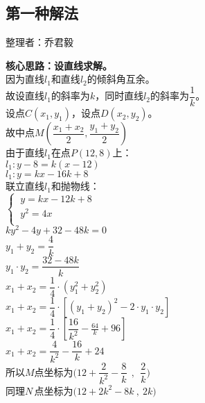 \documentclass[UTF8]{ctexart}
\begin{document}
\newpage

\subsection{第一种解法}
    \begin{center}
        整理者：乔君毅
    \end{center}
    \begin{multicols}{2}
        \small
        \textbf{核心思路：设直线求解。}\\[5mm]
        因为直线$l_1$和直线$l_2$的倾斜角互余。\\[5mm]
        故设直线$l_1$的斜率为$k$，同时直线$l_2$的斜率为$\dfrac{1}{k}$。\\[5mm]
        设点$C(x_1,y_1)$，设点$D(x_2,y_2)$。\\[5mm]
        故中点$M(\dfrac{x_1+x_2}{2},\dfrac{y_1+y_2}{2})$\\[5mm]
        由于直线$l_1$在点$P(12,8)$上：\\[3mm]
        $l_1:y-8=k(x-12)$\\[5mm]
        $l_1:y=kx-16k+8$\\[5mm]
        联立直线$l_1$和抛物线：\\[5mm]
        \begin{math}
            \begin{cases}
                ~y=kx-12k+8\\[1mm]
                ~y^2=4x\\[1mm]
                \end{cases}        
        \end{math}\\[5mm]
        $ky^2-4y+32-48k=0$\\[5mm]
        $y_1+y_2=\dfrac{4}{k}$\\[5mm]
        $y_1\cdot y_2=\dfrac{32-48k}{k} $\\[5mm]
        $x_1+x_2=\dfrac{1}{4}\cdot\left(y_1^2+y_2^2\right)$\\[5mm]
        $x_1+x_2=\dfrac{1}{4}\cdot\left[\left(y_1+y_2\right)^2-2\cdot y_1\cdot y_2\right]$\\[5mm]
        $x_1+x_2=\dfrac{1}{4}\cdot\left[\dfrac{16}{k^2}-\frac{64}{k}+96\right]$\\[5mm]
        $x_1+x_2=\dfrac{4}{k^2}-\dfrac{16}{k}+24$\\[5mm]
        所以$M$点坐标为$\Big(12+\dfrac{2}{k^2}-\dfrac{8}{k}~~,~~\dfrac{2}{k}\Big)$\\[5mm]
        同理$N\,$点坐标为$\Big(12+2k^2-8k~,~2k\Big)$\\[50mm]

\end{multicols}
\end{document}

